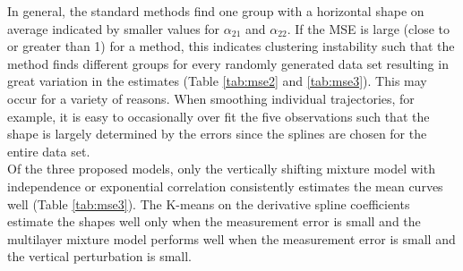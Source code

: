  In general, the standard methods find one group with a horizontal shape on average indicated by smaller values for $\alpha_{21}$ and $\alpha_{22}$. If the MSE is large (close to or greater than 1) for a method, this indicates clustering instability such that the method finds different groups for every randomly generated data set resulting in great variation in the estimates (Table \ref{tab:mse2} and \ref{tab:mse3}). This may occur for a variety of reasons. When smoothing individual trajectories, for example, it is easy to occasionally over fit the five observations such that the shape is largely determined by the errors since the splines are chosen for the entire data set.\\
 
 Of the three proposed models, only the vertically shifting mixture model with independence or exponential correlation consistently estimates the mean curves well (Table \ref{tab:mse3}). The K-means on the derivative spline coefficients estimate the shapes well only when the measurement error is small and the multilayer mixture model performs well when the measurement error is small and the vertical perturbation is small. \\

